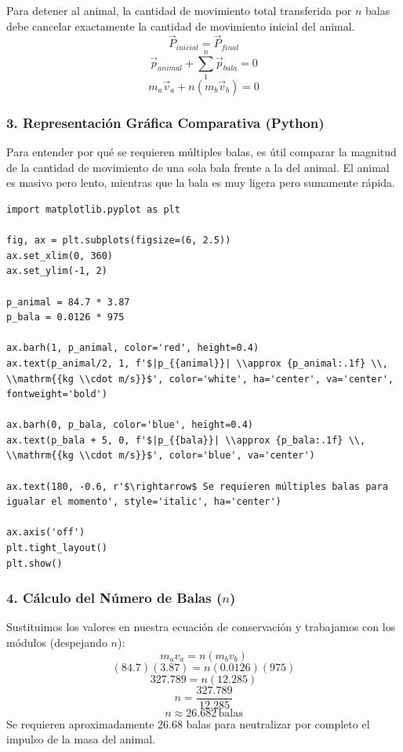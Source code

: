 \documentclass[12pt, a4paper]{article}
\begin{document}
Para detener al animal, la cantidad de movimiento total transferida por $n$ balas debe cancelar exactamente la cantidad de movimiento inicial del animal. 
\[ \vec{P}_{inicial} = \vec{P}_{final} \]
\[ \vec{p}_{animal} + \sum_{1}^{n} \vec{p}_{bala} = 0 \]
\[ m_a \vec{v}_a + n (m_b \vec{v}_b) = 0 \]

\subsubsection*{3. Representación Gráfica Comparativa (Python)}
Para entender por qué se requieren múltiples balas, es útil comparar la magnitud de la cantidad de movimiento de una sola bala frente a la del animal. El animal es masivo pero lento, mientras que la bala es muy ligera pero sumamente rápida.

\begin{lstlisting}
import matplotlib.pyplot as plt

fig, ax = plt.subplots(figsize=(6, 2.5))
ax.set_xlim(0, 360)
ax.set_ylim(-1, 2)

p_animal = 84.7 * 3.87
p_bala = 0.0126 * 975

ax.barh(1, p_animal, color='red', height=0.4)
ax.text(p_animal/2, 1, f'$|p_{{animal}}| \\approx {p_animal:.1f} \\, \\mathrm{{kg \\cdot m/s}}$', color='white', ha='center', va='center', fontweight='bold')

ax.barh(0, p_bala, color='blue', height=0.4)
ax.text(p_bala + 5, 0, f'$|p_{{bala}}| \\approx {p_bala:.1f} \\, \\mathrm{{kg \\cdot m/s}}$', color='blue', va='center')

ax.text(180, -0.6, r'$\rightarrow$ Se requieren múltiples balas para igualar el momento', style='italic', ha='center')

ax.axis('off')
plt.tight_layout()
plt.show()
\end{lstlisting}

\subsubsection*{4. Cálculo del Número de Balas ($n$)}
Sustituimos los valores en nuestra ecuación de conservación y trabajamos con los módulos (despejando $n$):
\[ m_a v_a = n (m_b v_b) \]
\[ (84.7)(3.87) = n (0.0126)(975) \]
\[ 327.789 = n (12.285) \]
\[ n = \frac{327.789}{12.285} \]
\[ n \approx 26.682 \, \text{balas} \]
Se requieren aproximadamente $26.68$ balas para neutralizar por completo el impulso de la masa del animal.
\end{document}
